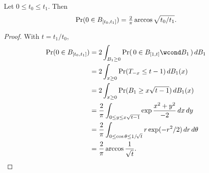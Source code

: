 \begin	{theorem}
Let \( 0 \le t_0 \le t_1\).
Then \[
	\Pr(0 \in B_{[t_0,t_1]}) = \tfrac2\pi\arccos\sqrt{t_0/t_1} \text.
\]
\end	{theorem}
\begin	{proof}
With \( t = t_1/t_0 \),
\begin	{align*}
	\Pr(0 \in B_{[t_0,t_1]})
	&=	2\int_{B_1\ge0}
			\Pr(\, 0 \in B_{[1,t]} \wcond B_1 \,) \,dB_1 \\
	&=	2\int_{x\ge0} \Pr( T_{-x} \le t-1 ) \,dB_1(x) \\
	&=	2\int_{x\ge0} \Pr( B_1 \ge x\sqrt{t-1} ) \,dB_1(x) \\
	&=	\frac2\pi
		\int_{0\le y\le x\sqrt{t-1}} \exp\frac{x^2+y^2}{-2}
			\,dx\,dy \\
	&=	\frac2\pi
		\int_{0\le\cos\theta\le1/\!\sqrt t}
			r\exp(-r^2/2) \,dr\,d\theta \\
	&=	\frac2\pi\arccos\frac1{\sqrt t} \text.
	\qedhere
\end	{align*}
\end	{proof}
